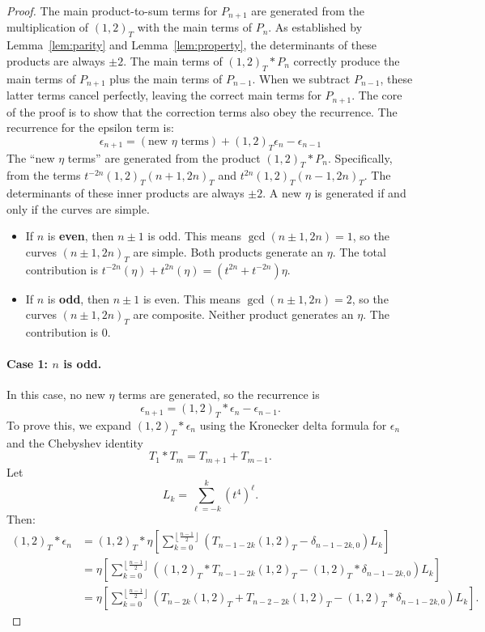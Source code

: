 \documentclass[12pt]{article}
\begin{document}
\begin{proof}
The main product-to-sum terms for $P_{n+1}$ are generated from the multiplication of $(1,2)_T$ with the main terms of $P_n$. As established by Lemma~\ref{lem:parity} and Lemma~\ref{lem:property}, the determinants of these products are always $\pm 2$. The main terms of $(1,2)_T \ast P_n$ correctly produce the main terms of $P_{n+1}$ plus the main terms of $P_{n-1}$. When we subtract $P_{n-1}$, these latter terms cancel perfectly, leaving the correct main terms for $P_{n+1}$. The core of the proof is to show that the correction terms also obey the recurrence. The recurrence for the epsilon term is:
\begin{equation*}
\epsilon_{n+1} = (\text{new } \eta \text{ terms}) + (1,2)_T \epsilon_n - \epsilon_{n-1}
\end{equation*}
The ``new $\eta$ terms'' are generated from the product $(1,2)_T \ast P_n$. Specifically, from the terms $t^{-2n}(1,2)_T(n+1,2n)_T$ and $t^{2n}(1,2)_T(n-1,2n)_T$. The determinants of these inner products are always $\pm 2$. A new $\eta$ is generated if and only if the curves are simple.
\begin{itemize}
    \item If $n$ is \textbf{even}, then $n\pm 1$ is odd. This means $\gcd(n\pm 1, 2n) = 1$, so the curves $(n\pm 1, 2n)_T$ are simple. Both products generate an $\eta$. The total contribution is $t^{-2n}(\eta) + t^{2n}(\eta) = (t^{2n}+t^{-2n})\eta$.
    \item If $n$ is \textbf{odd}, then $n\pm 1$ is even. This means $\gcd(n\pm 1, 2n) = 2$, so the curves $(n\pm 1, 2n)_T$ are composite. Neither product generates an $\eta$. The contribution is 0.
\end{itemize}
\paragraph{Case 1: $n$ is odd.}
In this case, no new $\eta$ terms are generated, so the recurrence is
\[
\epsilon_{n+1} = (1,2)_T \ast \epsilon_n - \epsilon_{n-1}.
\]
To prove this, we expand $(1,2)_T \ast \epsilon_n$ using the Kronecker delta formula for $\epsilon_n$ and the Chebyshev identity
\[
T_1 \ast T_m = T_{m+1} + T_{m-1}.
\]
Let
\[
L_k = \sum_{\ell = -k}^k (t^4)^\ell.
\]
Then:
\begin{align*}
(1,2)_T \ast \epsilon_n 
&= (1,2)_T \ast \eta \left[ \sum_{k=0}^{\left\lfloor\frac{n-1}{2}\right\rfloor} \left( T_{n-1 - 2k}(1,2)_T - \delta_{n-1 - 2k, 0} \right) L_k \right] \\
&= \eta \left[ \sum_{k=0}^{\left\lfloor\frac{n-1}{2}\right\rfloor} \left( (1,2)_T \ast T_{n-1 - 2k}(1,2)_T - (1,2)_T \ast \delta_{n-1 - 2k, 0} \right) L_k \right] \\
&= \eta \left[ \sum_{k=0}^{\left\lfloor\frac{n-1}{2}\right\rfloor} \left( T_{n - 2k}(1,2)_T + T_{n - 2 - 2k}(1,2)_T - (1,2)_T \ast \delta_{n-1 - 2k, 0} \right) L_k \right].
\end{align*}


\end{proof}
\end{document}
